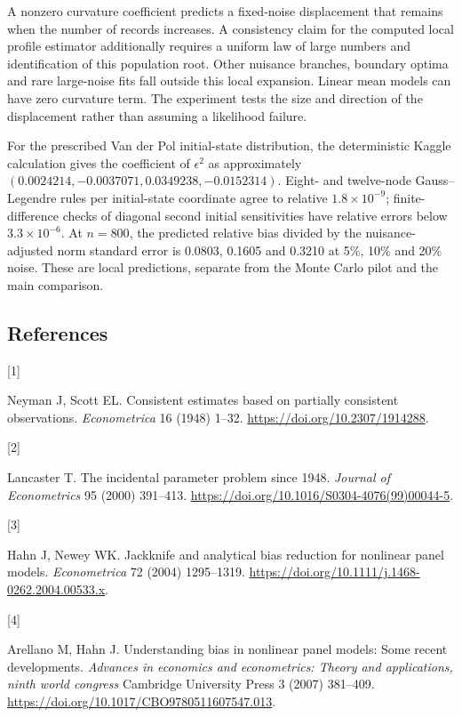 \documentclass[
  american,
  11pt,
]{article}
\newlength{\cslhangindent}
\newlength{\csllabelwidth}
\newenvironment{CSLReferences}[2] %
 {\begin{list}{}{%
  \setlength{\itemindent}{0pt}
  \setlength{\leftmargin}{0pt}
  \setlength{\parsep}{0pt}
  \ifodd #1
   \setlength{\leftmargin}{\cslhangindent}
   \setlength{\itemindent}{-1\cslhangindent}
  \fi
  \setlength{\itemsep}{#2\baselineskip}}}
 {\end{list}}
\newcommand{\CSLLeftMargin}[1]{\parbox[t]{\csllabelwidth}{\strut#1\strut}}
\newcommand{\CSLRightInline}[1]{\parbox[t]{\linewidth - \csllabelwidth}{\strut#1\strut}}
\begin{document}
A nonzero curvature coefficient predicts a fixed-noise displacement that
remains when the number of records increases. A consistency claim for
the computed local profile estimator additionally requires a uniform law
of large numbers and identification of this population root. Other
nuisance branches, boundary optima and rare large-noise fits fall
outside this local expansion. Linear mean models can have zero curvature
term. The experiment tests the size and direction of the displacement
rather than assuming a likelihood failure.

For the prescribed Van der Pol initial-state distribution, the
deterministic Kaggle calculation gives the coefficient of \(\epsilon^2\)
as approximately \((0.0024214,-0.0037071,0.0349238,-0.0152314)\). Eight-
and twelve-node Gauss--Legendre rules per initial-state coordinate agree
to relative \(1.8\times10^{-9}\); finite-difference checks of diagonal
second initial sensitivities have relative errors below
\(3.3\times10^{-6}\). At \(n=800\), the predicted relative bias divided
by the nuisance-adjusted norm standard error is 0.0803, 0.1605 and
0.3210 at 5\%, 10\% and 20\% noise. These are local predictions,
separate from the Monte Carlo pilot and the main comparison.

\subsection*{References}\label{references}

\protect{}\label{refs}
\begin{CSLReferences}{0}{0}
\CSLLeftMargin{{[}1{]} }%
\CSLRightInline{Neyman J, Scott EL. Consistent estimates based on
partially consistent observations. \emph{Econometrica} 16 (1948) 1--32.
\url{https://doi.org/10.2307/1914288}.}

\CSLLeftMargin{{[}2{]} }%
\CSLRightInline{Lancaster T. The incidental parameter problem since
1948. \emph{Journal of Econometrics} 95 (2000) 391--413.
\url{https://doi.org/10.1016/S0304-4076(99)00044-5}.}

\CSLLeftMargin{{[}3{]} }%
\CSLRightInline{Hahn J, Newey WK. Jackknife and analytical bias
reduction for nonlinear panel models. \emph{Econometrica} 72 (2004)
1295--1319. \url{https://doi.org/10.1111/j.1468-0262.2004.00533.x}.}

\CSLLeftMargin{{[}4{]} }%
\CSLRightInline{Arellano M, Hahn J. Understanding bias in nonlinear
panel models: Some recent developments. \emph{Advances in economics and
econometrics: Theory and applications, ninth world congress} Cambridge
University Press 3 (2007) 381--409.
\url{https://doi.org/10.1017/CBO9780511607547.013}.}

\end{CSLReferences}
\end{document}
